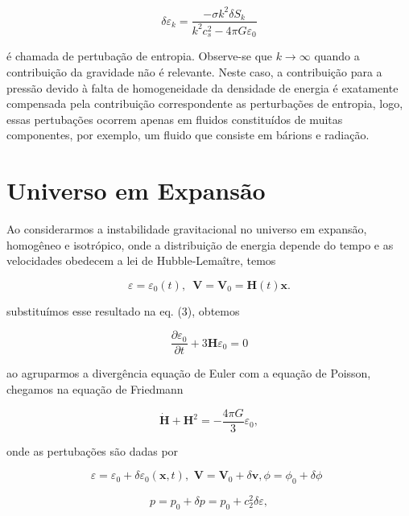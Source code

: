 \begin{equation}\label{eq19}
	\delta\varepsilon_k  = \dfrac{ -\sigma k^2 \delta S_k}{k^2c^2_s - 4\pi G\varepsilon_0}
\end{equation}

é chamada de pertubação de entropia. Observe-se que $k \to \infty$ quando a contribuição da gravidade não é relevante. Neste caso, a contribuição para a pressão devido à falta de homogeneidade da densidade de energia é exatamente compensada pela contribuição correspondente as perturbações de entropia, logo, essas pertubações ocorrem apenas em fluidos constituídos de muitas componentes, por exemplo, um fluido que consiste em bárions e radiação.

\section*{Universo em Expansão}

Ao considerarmos a instabilidade gravitacional no universo em expansão, homogêneo e isotrópico, onde a distribuição de energia depende do tempo e as velocidades obedecem a lei de Hubble-Lemaître, temos

\begin{equation}\label{eq20}
	\varepsilon = \varepsilon_0 (t), \,\,\, \mathbf{V} = \mathbf{V}_0 = \mathbf{H} (t) \mathbf{x}.
\end{equation}
 
 substituímos esse resultado na eq. (3), obtemos
 
\begin{equation}\label{eq21}
	\dfrac{\partial \varepsilon_0}{\partial t}  + 3 \mathbf{H}\varepsilon_0 = 0 
\end{equation} 

ao agruparmos a divergência equação de Euler com a equação de Poisson, chegamos na equação de Friedmann

\begin{equation}\label{eq22}
	\dot{\mathbf{H}} + \mathbf{H}^2 = - \dfrac{4\pi G}{3}\varepsilon_0,
\end{equation}

onde as pertubações são dadas por

\begin{equation}\label{eq23}
	\varepsilon = \varepsilon_0 + \delta\varepsilon_0 (\mathbf{x},t),\,\, \mathbf{V} = \mathbf{V}_0 + \delta\mathbf{v} , \phi= \phi_0 + \delta\phi\,\,\, 
\end{equation}

$$p = p_0 + \delta p= p_0 + c_2^2\delta\varepsilon ,$$


